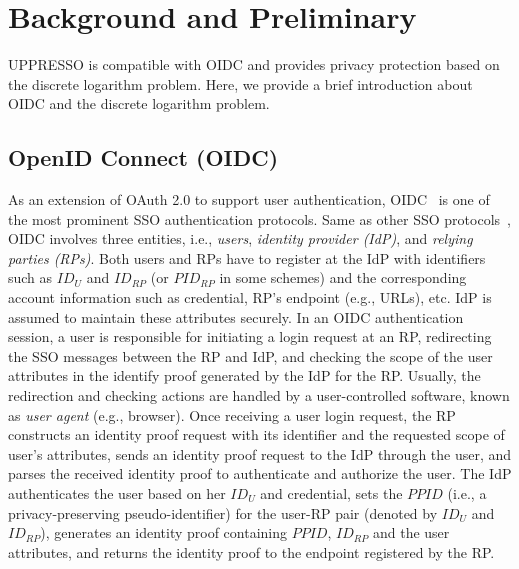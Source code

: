 \section{Background and Preliminary}
\label{sec:background}
UPPRESSO is compatible with OIDC and provides privacy protection based on the discrete logarithm problem. Here, we provide a brief introduction about OIDC and the discrete logarithm problem.

\subsection{OpenID Connect (OIDC)}
\label{subsec:OIDC}
As an extension of OAuth 2.0 to support user authentication, OIDC~\cite{OpenIDConnect} is one of the most prominent SSO authentication protocols. Same as other SSO protocols~\cite{SAMLIdentifier}, OIDC involves three entities, i.e., {\em users}, {\em identity provider (IdP)}, and {\em relying parties (RPs)}.
Both users and RPs have to register at the IdP with identifiers such as $ID_U$ and $ID_{RP}$ (or $PID_{RP}$ in some schemes) and the corresponding account information such as credential, RP's endpoint (e.g., URLs), etc.
IdP is assumed to maintain these attributes securely. In an OIDC authentication session, a user is responsible for initiating a login request at an RP, redirecting the SSO messages between the RP and IdP, and checking the scope of the user attributes in the identify proof generated by the IdP for the RP. Usually, the redirection and checking actions are handled by a user-controlled software, known as {\em user agent} (e.g., browser). Once receiving a user login request, the RP constructs an identity proof request with its identifier and the requested scope of  user's attributes, sends an identity proof request to the IdP through the user, and parses the received identity proof to authenticate and authorize the user. The IdP authenticates the user based on her $ID_U$ and credential, sets the $PPID$ (i.e., a privacy-preserving pseudo-identifier) for the user-RP pair (denoted by $ID_U$ and $ID_{RP}$), generates an identity proof containing $PPID$, $ID_{RP}$ and the user attributes, and returns the identity proof to the endpoint registered by the RP.

